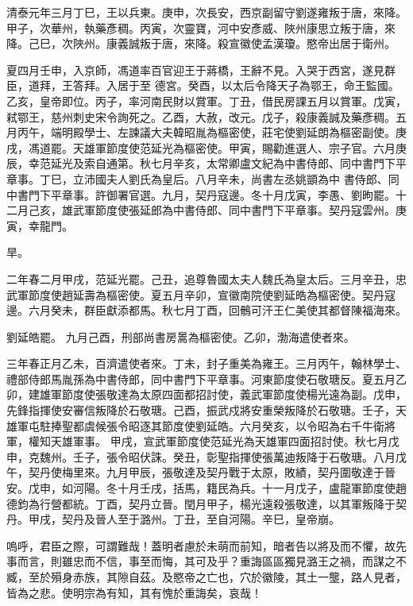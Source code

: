 \begin{pinyinscope}
 清泰元年三月丁巳，王以兵東。庚申，次長安，西京副留守劉遂雍叛于唐，來降。甲子，次華州，執藥彥稠。丙寅，次靈寶，河中安彥威、陜州康思立叛于唐，來降。己巳，次陜州。康義誠叛于唐，來降。殺宣徽使孟漢瓊。愍帝出居于衛州。



 夏四月壬申，入京師，馮道率百官迎王于蔣橋，王辭不見。入哭于西宮，遂見群臣，道拜，王答拜。入居于至
 德宮。癸酉，以太后令降天子為鄂王，命王監國。乙亥，皇帝即位。丙子，率河南民財以賞軍。丁丑，借民房課五月以賞軍。戊寅，弒鄂王，慈州刺史宋令詢死之。乙酉，大赦，改元。戊子，殺康義誠及藥彥稠。五月丙午，端明殿學士、左諫議大夫韓昭胤為樞密使，莊宅使劉延朗為樞密副使。庚戌，馮道罷。天雄軍節度使范延光為樞密使。甲寅，賜勸進選人、宗子官。六月庚辰，幸范延光及索自通第。秋七月辛亥，太常卿盧文紀為中書侍郎、同中書門下平章事。丁巳，立沛國夫人劉氏為皇后。八月辛未，尚書左丞姚顗為中
 書侍郎、同中書門下平章事。許御署官選。九月，契丹寇邊。冬十月戊寅，李愚、劉昫罷。十二月己亥，雄武軍節度使張延郎為中書侍郎、同中書門下平章事。契丹寇雲州。庚寅，幸龍門。



 旱。



 二年春二月甲戌，范延光罷。己丑，追尊魯國太夫人魏氏為皇太后。三月辛丑，忠武軍節度使趙延壽為樞密使。夏五月辛卯，宣徽南院使劉延皓為樞密使。契丹寇邊。六月癸未，群臣獻添都馬。秋七月丁酉，回鶻可汗王仁美使其都督陳福海來。



 劉延皓罷。
 九月己酉，刑部尚書房暠為樞密使。乙卯，渤海遣使者來。



 三年春正月乙未，百濟遣使者來。丁未，封子重美為雍王。三月丙午，翰林學士、禮部侍郎馬胤孫為中書侍郎，同中書門下平章事。河東節度使石敬瑭反。夏五月乙卯，建雄軍節度使張敬達為太原四面都招討使，義武軍節度使楊光遠為副。戊申，先鋒指揮使安審信叛降於石敬瑭。己酉，振武戍將安重榮叛降於石敬瑭。壬子，天雄軍屯駐捧聖都虞候張令昭逐其節度使劉延皓。六月癸亥，以令昭為右千牛衛將軍，權知天雄軍事。
 甲戌，宣武軍節度使范延光為天雄軍四面招討使。秋七月戊申，克魏州。壬子，張令昭伏誅。癸丑，彰聖指揮使張萬迪叛降于石敬瑭。八月戊午，契丹使梅里來。九月甲辰，張敬達及契丹戰于太原，敗績，契丹圍敬達于晉安。戊申，如河陽。冬十月壬戌，括馬，籍民為兵。十一月戊子，盧龍軍節度使趙德鈞為行營都統。丁酉，契丹立晉。閏月甲子，楊光遠殺張敬達，以其軍叛降于契丹。甲戌，契丹及晉人至于潞州。丁丑，至自河陽。辛巳，皇帝崩。



 嗚呼，君臣之際，可謂難哉！蓋明者慮於未萌而前知，暗者告以將及而不懼，故先事而言，則雖忠而不信，事至而悔，其可及乎？重誨區區獨見潞王之禍，而謀之不臧，至於殞身赤族，其隙自茲。及愍帝之亡也，穴於徽陵，其土一壟，路人見者，皆為之悲。使明宗為有知，其有愧於重誨矣，哀哉！



\end{pinyinscope}